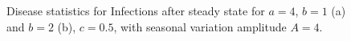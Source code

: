 \begin{figure}
    \centering
    \caption{Disease statistics for Infections after steady state for $a=4$, $b=1$ (a) and $b=2$ (b), $c=0.5$, with seasonal variation amplitude $A = 4$.}
    \label{fig:seasonalb1}
\end{figure}

